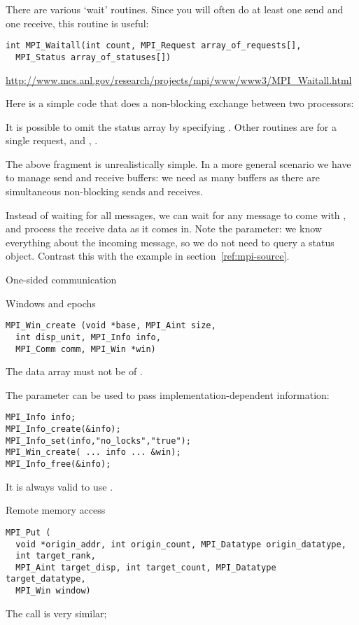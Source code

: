 There are various `wait' routines. Since you will often do at least
one send and one receive, this routine is useful:
\begin{verbatim}
int MPI_Waitall(int count, MPI_Request array_of_requests[], 
  MPI_Status array_of_statuses[])
\end{verbatim}
\url{http://www.mcs.anl.gov/research/projects/mpi/www/www3/MPI_Waitall.html}

Here is a simple code that does a non-blocking exchange between two processors:

It is possible to omit the status array by specifying .
Other routines are  for a single request, and
, .

The above fragment is unrealistically simple. In a more general scenario we
have to manage send and receive buffers: we need as many buffers as there are
simultaneous non-blocking sends and receives.

Instead of waiting for all messages, we can wait for any message to come
with , and process the receive data as it comes in.
Note the  parameter: we know everything
about the incoming message, so we do not need to query a status object.
Contrast this with the example in section~\ref{ref:mpi-source}.

 {One-sided communication}

 {Windows and epochs}

\begin{verbatim}
MPI_Win_create (void *base, MPI_Aint size, 
  int disp_unit, MPI_Info info, 
  MPI_Comm comm, MPI_Win *win)
\end{verbatim}
The data array must not be  of .

The  parameter can be used to pass implementation-dependent 
information:
\begin{verbatim}
MPI_Info info;
MPI_Info_create(&info);
MPI_Info_set(info,"no_locks","true");
MPI_Win_create( ... info ... &win);
MPI_Info_free(&info);
\end{verbatim}
It is always valid to use .

 {Remote memory access}

\begin{verbatim}
MPI_Put (
  void *origin_addr, int origin_count, MPI_Datatype origin_datatype,
  int target_rank,
  MPI_Aint target_disp, int target_count, MPI_Datatype target_datatype,
  MPI_Win window)
\end{verbatim}
The  call is very similar;

